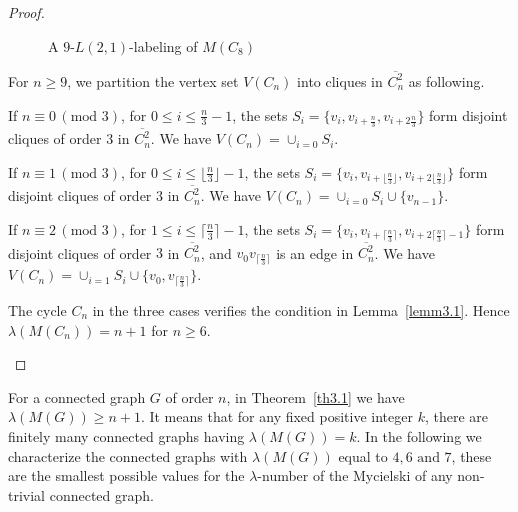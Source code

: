 \documentclass{article}
\newtheorem{open problem} {Open Problem}
\numberwithin{lemma}{section}
\numberwithin{theorem}{section}
\numberwithin{cor}{section}
\numberwithin{prop}{section}
\numberwithin{con}{section}
\numberwithin{claim}{section}
\numberwithin{obs}{section}
\numberwithin{dnt}{section}
\begin{document}
\begin{proof}
\begin{itemize}
\begin{figure}[h]
\begin{minipage}{.5\textwidth}
				\caption{\label{fig5}A $9$-$L(2,1)$-labeling of $M(C_8)$  }
			\end{minipage}
		\end{figure}
		\par For $n\geq 9$, we partition the vertex set $V(C_n)$ into cliques in  $\overline{C^2_n}$ as following. 	
		\par If $n\equiv 0\,(\text{mod }3)$, for $0\leq i\leq \frac{n}{3}-1$, the sets  $S_i=\{v_i,v_{i+\frac{n}{3}},v_{i+2\frac{n}{3}}  \}$ form disjoint cliques of order $3$ in $\overline{C^2_n}$. We have $V(C_n)=\cup_{i=0} S_i$.  
		\par If $n\equiv 1\,(\text{mod }3)$, for $0\leq i\leq \lfloor \frac{n}{3}\rfloor-1$, the sets  $S_i=\{v_i,v_{i+\lfloor \frac{n}{3}\rfloor},v_{i+2\lfloor \frac{n}{3}\rfloor}  \}$ form disjoint cliques of order $3$ in $\overline{C^2_n}$. We have  $V(C_n)=\cup_{i=0} S_i \cup \{v_{n-1}\}$. 
		\par If $n\equiv 2\,(\text{mod }3)$, for  $1\leq i\leq \lceil \frac{n}{3}\rceil-1$, the sets  $S_i=\{v_i,v_{i+\lceil \frac{n}{3}\rceil},v_{i+2\lceil \frac{n}{3}\rceil-1}  \}$ form disjoint cliques of order $3$ in $\overline{C^2_n}$, and $v_0v_{\lceil \frac{n}{3}\rceil}$ is an edge in $\overline{C^2_n}$. We have $V(C_n)=\cup_{i=1} S_i \cup\{v_0,v_{\lceil \frac{n}{3}\rceil} \}$.\par
		The cycle $C_n$ in the three cases verifies the condition in Lemma~\ref{lemm3.1}. Hence    $\lambda(M(C_n))=n+1$ for  $n\geq 6$.
	\end{itemize}
	\vspace{-4\topsep}
	\end{proof}
For a connected graph $G$ of order $n$, in Theorem~\ref{th3.1} we have $\lambda(M(G))\geq n+1$. It means that for any fixed positive integer $k$, there are finitely many connected graphs having $\lambda(M(G))=k$. In the following we characterize the connected graphs with $\lambda(M(G))$ equal to $4,6\text{ and }7$, these are the smallest possible values for the $\lambda$-number of the Mycielski of any non-trivial connected graph.
\end{document}
